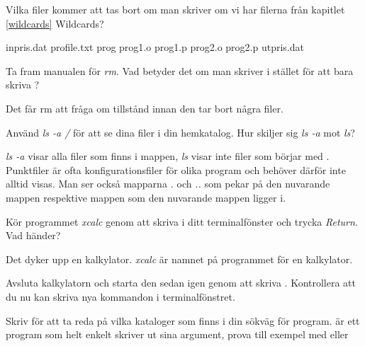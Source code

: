 \documentclass[a4paper,twocolumn]{book}
\begin{document}
\begin{exercise}
  Vilka filer kommer att tas bort om man skriver  om vi har
  filerna från kapitlet \ref{wildcards} Wildcards?
  \begin{answer}
    inpris.dat profile.txt prog prog1.o prog1.p prog2.o prog2.p
    utpris.dat
  \end{answer}
\end{exercise}

\begin{exercise}
  Ta fram manualen för \emph{rm}. Vad betyder det om man skriver
   i stället för att bara skriva ?
  \begin{answer}
    Det får rm att fråga om tillstånd innan den tar bort några filer.
  \end{answer}
\end{exercise}

\begin{exercise}
  Använd \emph{ls -a \ST{\~}/} för att se dina filer i din hemkatalog.
  Hur skiljer sig \emph{ls -a} mot \emph{ls}?
  \begin{answer}
    \emph{ls -a} visar alla filer som finns i mappen, \emph{ls} visar
    inte filer som börjar med . Punktfiler är ofta konfigurationsfiler
    för olika program och behöver därför inte alltid visas. Man ser också mapparna
    \emph{.} och \emph{..} som pekar på den nuvarande mappen respektive mappen som den nuvarande
    mappen ligger i.
  \end{answer}
\end{exercise}

\begin{exercise}
  Kör programmet \emph{xcalc} genom att skriva  i
  ditt terminalfönster och trycka \emph{Return}. Vad händer?
  \begin{answer}
    Det dyker upp en kalkylator. \emph{xcalc} är namnet på
    programmet för en kalkylator.
  \end{answer}
\end{exercise}
\begin{exercise}
  Avsluta kalkylatorn och starta den sedan
  igen genom att skriva . Kontrollera att du
  nu kan skriva nya kommandon i terminalfönstret.
\end{exercise}

\begin{exercise}
  Skriv  för att ta reda på vilka kataloger som finns i
  din sökväg för program.  är ett program som helt
  enkelt skriver ut sina argument, prova till exempel med
   eller 
\end{exercise}
\end{document}
